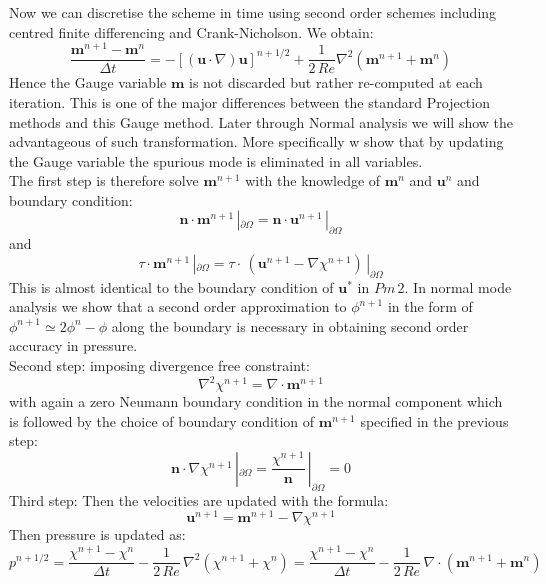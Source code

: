 Now we can discretise the scheme in time using second order schemes including centred finite differencing and Crank-Nicholson. We obtain:
\begin{equation*}
\dfrac{\textbf{m}^{n+1} - \textbf{m}^n}{\Delta t} = -\left[(\textbf{u} \cdot \nabla)\textbf{u}\right]^{n+1/2} + \dfrac{1}{2\,Re}\nabla^2\left(\textbf{m}^{n+1} + \textbf{m}^n\right)
\end{equation*}
Hence the Gauge variable $\textbf{m}$ is not discarded but rather re-computed at each iteration. This is one of the major differences between the standard Projection methods and this Gauge method. Later through Normal analysis we will show the advantageous of such transformation. More specifically w show that by updating the Gauge variable the spurious mode is eliminated in all variables.\\

The first step is therefore solve $\textbf{m}^{n+1}$ with the knowledge of $\textbf{m}^n$ and $\textbf{u}^n$ and boundary condition:
\begin{equation*}
\textbf{n}\cdot\textbf{m}^{n+1}\,|_{\partial \Omega} = \textbf{n} \cdot \textbf{u}^{n+1}\,|_{\partial \Omega}
\end{equation*}
and 
\begin{equation*}
\textbf{$\tau$}\cdot\textbf{m}^{n+1}\,|_{\partial \Omega} = \textbf{$\tau$} \cdot\,(\textbf{u}^{n+1} - \nabla \chi^{n+1})\,|_{\partial \Omega}
\end{equation*}
This is almost identical to the boundary condition of $\textbf{u}^*$ in $Pm\,2$. In normal mode analysis we show that a second order approximation to $\phi^{n+1}$ in the form of $\phi^{n+1}\simeq 2\phi^n - \phi$ along the boundary is necessary in obtaining second order accuracy in pressure.\\

Second step: imposing divergence free constraint:
\begin{equation*}
\nabla^2\chi^{n+1} = \nabla \cdot \textbf{m}^{n+1}
\end{equation*}
with again a zero Neumann boundary condition in the normal component which is followed by the choice of boundary condition of $\textbf{m}^{n+1}$ specified in the previous step:
\begin{equation*}
\textbf{n} \cdot \nabla \chi^{n+1}\,|_{\partial \Omega}  = \dfrac{\chi^{n+1}}{\textbf{n}}\,|_{\partial \Omega}  = 0
\end{equation*}
Third step: Then the velocities are updated with the formula:
\begin{equation*}
\textbf{u}^{n+1} = \textbf{m}^{n+1} - \nabla \chi^{n+1}
\end{equation*}
Then pressure is updated as:
\begin{equation*}
p^{n+1/2} = \dfrac{\chi^{n+1} - \chi^n}{\Delta t} - \dfrac{1}{2\,Re}\,\nabla^2(\chi^{n+1} + \chi^n) = \dfrac{\chi^{n+1} - \chi^n}{\Delta t} - \dfrac{1}{2\,Re}\,\nabla \cdot (\textbf{m}^{n+1} + \textbf{m}^n)
\end{equation*}

